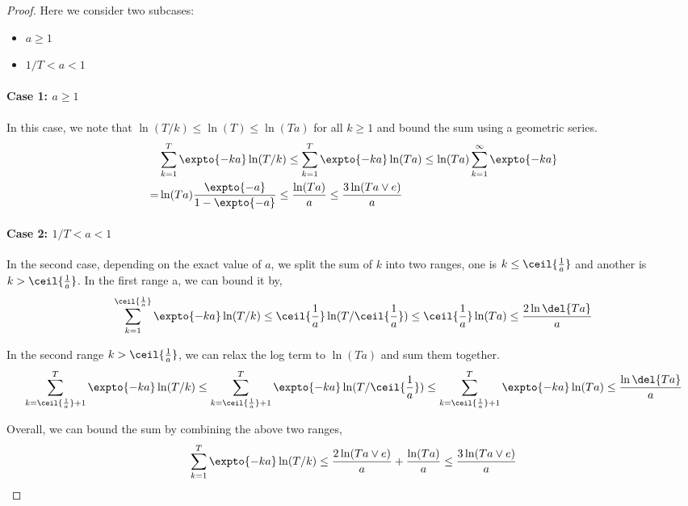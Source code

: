     \begin{proof}
        Here we consider two subcases:
        \begin{itemize}
            \item $a \geq 1$
            \item $1/T < a < 1$
        \end{itemize}
        \paragraph{Case 1: $a \geq 1$} In this case, we note that $\ln(T/k) \leq \ln(T) \leq \ln(Ta)$ for all $k \geq 1$ and bound the sum using a geometric series.
        \begin{align*}
            & 
                \sum_{k=1}^T \expto{-k a } \ln(T/k)
            \leq
                \sum_{k=1}^T \expto{-k a } \ln(Ta)
            \leq
                \ln(Ta) \sum_{k=1}^\infty \expto{-k a}
            \\
            =&
                \ln(Ta) \frac{\expto{-a}}{1-\expto{-a}}
            \leq
                \frac{\ln(Ta)}{a}
            \leq
                \frac{3\ln(Ta \vee e)}{a}
        \end{align*}


        \paragraph{Case 2: $1/T < a < 1$}
        In the second case, depending on the exact value of $a$, we split the sum of $k$ into two ranges, one is $k \leq \ceil{\frac{1}{a}}$ and another is $k > \ceil{\frac{1}{a}}$. 
        In the first range a, we can bound it by,
        \begin{align*}
            \sum_{k=1}^{\ceil{\frac{1}{a}}} \expto{-k a } \ln(T/k)
            \leq
                \ceil{\frac{1}{a}}\ln(T/\ceil{\frac{1}{a}})
            \leq
                \ceil{\frac{1}{a}} \ln(Ta)
            \leq
                \frac{2\ln\del{Ta}}{a} 
        \end{align*}

        In the second range $k > \ceil{\frac{1}{a}}$, we can relax the log term to $\ln(Ta)$ and sum them together.
        \[
            \sum_{k=\ceil{\frac{1}{a}} + 1}^{T} \expto{-k a } \ln(T/k)
            \leq
                \sum_{k=\ceil{\frac{1}{a}} + 1}^{T} \expto{-ka} \ln(T/\ceil{\frac{1}{a}})
            \leq
                \sum_{k=\ceil{\frac{1}{a}} + 1}^{T} \expto{-ka} \ln(Ta)
            \leq
                \frac{\ln\del{Ta}}{a} 
        \]

        Overall, we can bound the sum by combining the above two ranges,
        \begin{align*}
            \sum_{k=1}^{T} \expto{-k a } \ln(T/k)
            \leq
            \frac{2\ln(Ta \vee e)}{a} + \frac{\ln(Ta)}{a}
            \leq
            \frac{3\ln(Ta \vee e)}{a}
        \end{align*}

    \end{proof}

